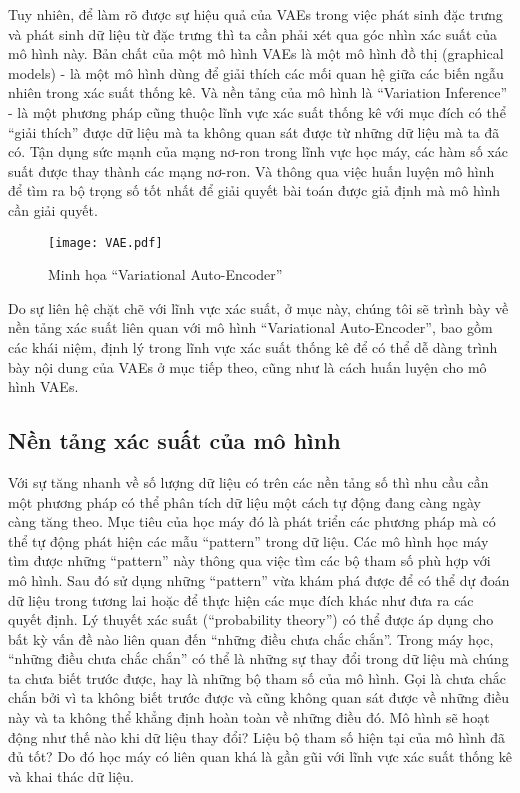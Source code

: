         Tuy nhiên, để làm rõ được sự hiệu quả của VAEs trong việc phát sinh đặc trưng và phát sinh dữ liệu từ đặc trưng thì ta cần phải xét qua góc nhìn xác suất của mô hình này.
        Bản chất của một mô hình VAEs là một mô hình đồ thị (graphical models) - là một mô hình dùng để giải thích các mối quan hệ giữa các biến ngẫu nhiên trong xác suất thống kê. Và nền tảng của mô hình là ``Variation Inference'' - là một phương pháp cũng thuộc lĩnh vực xác suất thống kê với mục đích có thể ``giải thích'' được dữ liệu mà ta không quan sát được từ những dữ liệu mà ta đã có. Tận dụng sức mạnh của mạng nơ-ron trong lĩnh vực học máy, các hàm số xác suất được thay thành các mạng nơ-ron. Và thông qua việc huấn luyện mô hình để tìm ra bộ trọng số tốt nhất để giải quyết bài toán được giả định mà mô hình cần giải quyết. 
        \begin{figure}
            \centering
            \texttt{[image: VAE.pdf]}
            \caption{Minh họa ``Variational Auto-Encoder''}
            \label{fig_VAE}
        \end{figure}
        Do sự liên hệ chặt chẽ với lĩnh vực xác suất, ở mục này, chúng tôi sẽ trình bày về nền tảng xác suất liên quan với mô hình ``Variational Auto-Encoder'', bao gồm các khái niệm, định lý trong lĩnh vực xác suất thống kê để có thể dễ dàng trình bày nội dung của VAEs ở mục tiếp theo, cũng như là cách huấn luyện cho mô hình VAEs. 
        

    \subsection{Nền tảng xác suất của mô hình} \label{chap2/subsec21}
        
        Với sự tăng nhanh về số lượng dữ liệu có trên các nền tảng số thì nhu cầu cần một phương pháp có thể phân tích dữ liệu một cách tự động đang  càng ngày càng tăng theo.
        Mục tiêu của học máy đó là phát triển các phương pháp mà có thể tự động phát hiện các mẫu ``pattern'' trong dữ liệu.
        Các mô hình học máy tìm được những ``pattern'' này thông qua việc tìm các bộ tham số phù hợp với mô hình.
        Sau đó sử dụng những ``pattern'' vừa khám phá được để có thể dự đoán dữ liệu trong tương lai hoặc để thực hiện các mục đích khác như đưa ra các quyết định.
        Lý thuyết xác suất (``probability theory'') có thể được áp dụng cho bất kỳ vấn đề nào liên quan đến ``những điều chưa chắc chắn''. 
        Trong máy học, ``những điều chưa chắc chắn'' có thể là những sự thay đổi trong dữ liệu mà chúng ta chưa biết trước được, hay là những bộ tham số của mô hình.
        Gọi là chưa chắc chắn bởi vì ta không biết trước được và cũng không quan sát được về những điều này và ta không thể khẳng định hoàn toàn về những điều đó.
        Mô hình sẽ hoạt động như thế nào khi dữ liệu thay đổi? Liệu bộ tham số hiện tại của mô hình đã đủ tốt?
        Do đó học máy có liên quan khá là gần gũi với lĩnh vực xác suất thống kê và khai thác dữ liệu.

